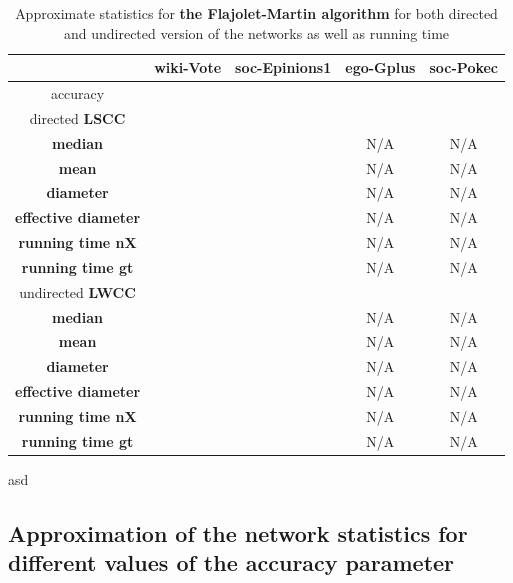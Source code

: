 \documentclass[12pt,a4paper]{article}
\begin{document}
\begin{table}[h!]
\centering
\caption{Approximate statistics for \textbf{the Flajolet-Martin algorithm} for both directed and undirected version of the networks as well as running time}
\begin{tabular}{c|c|c|c|c}
	& \textbf{wiki-Vote}	& \textbf{soc-Epinions1}	& \textbf{ego-Gplus}	&	\textbf{soc-Pokec}\\ \hline
accuracy	&  	& 	& 	&	\\ \hline
directed \textbf{LSCC}	& 	& 	& 	&	\\ \hline
\textbf{median} 			&	 			&					&N/A				&N/A	\\
\textbf{mean} 			&	 			&					&N/A				&N/A	\\
\textbf{diameter} 		&	 			&					&N/A				&N/A	\\
\textbf{effective diameter} 	&	 			&					&N/A				&N/A	\\
\textbf{running time nX}	&				&					&N/A				&N/A	\\
\textbf{running time gt}	&				&					&N/A				&N/A	\\ \hline
undirected \textbf{LWCC}	& 	& 	& 	&	\\ \hline
\textbf{median} 			&	 			&					&N/A				&N/A	\\
\textbf{mean} 			&	 			&					&N/A				&N/A	\\
\textbf{diameter} 		&	 			&					&N/A				&N/A	\\
\textbf{effective diameter} 	&	 			&					&N/A				&N/A	\\
\textbf{running time nX} 	&				&					&N/A				&N/A	\\
\textbf{running time gt} 	&				&					&N/A				&N/A
\end{tabular}
\label{tab:approximatestatistics_Flajolet-Martin}
\end{table}

\newpage
asd

\newpage

\subsection{Approximation of the network statistics for different values of the accuracy parameter}
\end{document}
